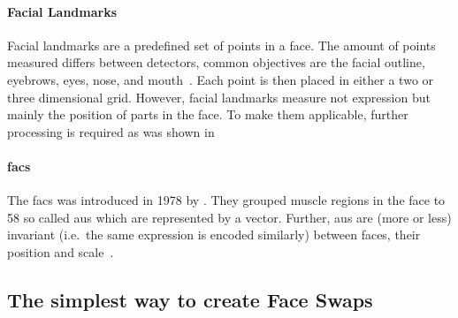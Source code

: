 \paragraph*{Facial Landmarks}
Facial landmarks are a predefined set of points in a face. The amount of points
measured differs between detectors, common objectives are the facial outline,
eyebrows, eyes, nose, and mouth~\cite[cf.][]{Johnston.2018}. Each point is then
placed in either a two or three dimensional grid. However, facial landmarks
measure not expression but mainly the position of parts in the face. To make
them applicable, further processing is required as was shown in~\cite{Ha.2020}

\paragraph*{\acrfull*{facs}}
The \gls{facs} was introduced in 1978 by \textcite{Ekman.1978}. They grouped
muscle regions in the face to 58 so called \glspl{au} which are represented
by a vector. Further, \glspl{au} are (more or less) invariant (i.e.\ the same
expression is encoded similarly) between faces, their position and scale~\cite{Pham.2018}.

\par



\subsection{The simplest way to create Face Swaps}

